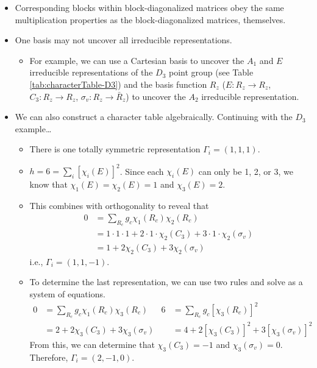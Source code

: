 \documentclass[../notes.tex]{subfiles}
\begin{document}
\begin{itemize}
    \item {}Corresponding blocks within block-diagonalized matrices obey the same multiplication properties as the block-diagonalized matrices, themselves.
    \item One basis may not uncover all irreducible representations.
    \begin{itemize}
        \item For example, we can use a Cartesian basis to uncover the $A_1$ and $E$ irreducible representations of the $D_3$ point group (see Table \ref{tab:characterTable-D3}) and the basis function $R_z$ ($E:R_z\to R_z$, $C_3:R_z\to R_z$, $\sigma_v:R_z\to \bar{R}_z$) to uncover the $A_2$ irreducible representation.
    \end{itemize}
    \item We can also construct a character table algebraically. Continuing with the $D_3$ example\dots
    \begin{itemize}
        \item There is one totally symmetric representation $\Gamma_i=(1,1,1)$.
        \item $h=6=\sum_i[\chi_i(E)]^2$. Since each $\chi_i(E)$ can only be 1, 2, or 3, we know that $\chi_1(E)=\chi_2(E)=1$ and $\chi_3(E)=2$.
        \item This combines with orthogonality to reveal that
        \begin{align*}
            0 &= \sum_{R_c}g_c\chi_1(R_c)\chi_2(R_c)\\
            &= 1\cdot 1\cdot 1+2\cdot 1\cdot\chi_2(C_3)+3\cdot 1\cdot\chi_2(\sigma_v)\\
            &= 1+2\chi_2(C_3)+3\chi_2(\sigma_v)
        \end{align*}
        i.e., $\Gamma_i=(1,1,-1)$.
        \item To determine the last representation, we can use two rules and solve as a system of equations.
        \begin{align*}
            0 &= \sum_{R_c}g_c\chi_1(R_c)\chi_3(R_c)&
                6 &= \sum_{R_c}g_c[\chi_3(R_c)]^2\\
            &= 2+2\chi_3(C_3)+3\chi_3(\sigma_v)&
                &= 4+2[\chi_3(C_3)]^2+3[\chi_3(\sigma_v)]^2
        \end{align*}
        From this, we can determine that $\chi_3(C_3)=-1$ and $\chi_3(\sigma_v)=0$. Therefore, $\Gamma_i=(2,-1,0)$.
    \end{itemize}
\end{itemize}
\end{document}
